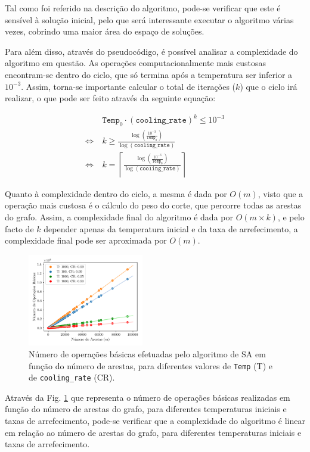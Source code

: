 \documentclass[mirror, portugues]{revdetua}
\begin{document}
Tal como foi referido na descrição do algoritmo, pode-se verificar que este é sensível à solução inicial, pelo que será interessante executar o algoritmo várias vezes, cobrindo uma maior área do espaço de soluções.

Para além disso, através do pseudocódigo, é possível analisar a complexidade do algoritmo em questão. As operações computacionalmente mais custosas encontram-se dentro do ciclo, que só termina após a temperatura ser inferior a $10^{-3}$. Assim, torna-se importante calcular o total de iterações ($k$) que o ciclo irá realizar, o que pode ser feito através da seguinte equação:

\begin{align*}
    &\texttt{Temp}_0 \cdot (\texttt{cooling\_rate})^k \le 10^{-3} \\
    \Leftrightarrow\ &  k \geq  \frac{\log\left(\frac{10^{-3}}{\texttt{Temp}_0}\right)}{\log(\texttt{cooling\_rate})} \\
    \Leftrightarrow\ & k = \left\lceil \frac{\log\left(\frac{10^{-3}}{\texttt{Temp}_0}\right)}{\log(\texttt{cooling\_rate})} \right\rceil
\end{align*}

\noindent Quanto à complexidade dentro do ciclo, a mesma é dada por $O(m)$, visto que a operação mais custosa é o cálculo do peso do corte, que percorre todas as arestas do grafo. Assim, a complexidade final do algoritmo é dada por $O(m \times k)$, e pelo facto de $k$ depender apenas da temperatura inicial e da taxa de arrefecimento, a complexidade final pode ser aproximada por $O(m)$.


\begin{figure}[H]
    \centering
    \includegraphics[width=0.45\textwidth]{../assets/ops_Simulated .png}
    \caption{Número de operações básicas efetuadas pelo algoritmo de SA em função do número de arestas, para diferentes valores de \texttt{Temp} (T) e de \texttt{cooling\_rate} (CR).}
    \label{fig:sa_ops}
\end{figure}


Através da Fig. \ref{fig:sa_ops} que representa o número de operações básicas realizadas em função do número de arestas do grafo, para diferentes temperaturas iniciais e taxas de arrefecimento, pode-se verificar que a complexidade do algoritmo é linear em relação ao número de arestas do grafo, para diferentes temperaturas iniciais e taxas de arrefecimento.
\end{document}
